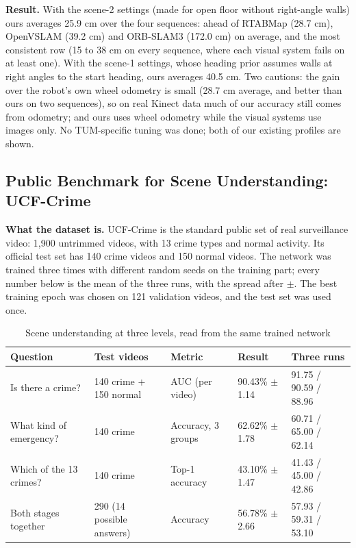 \documentclass[11pt, a4paper]{article}
\begin{document}
\noindent
\textbf{Result.} With the scene-2 settings (made for open floor without right-angle walls) ours averages 25.9 cm over the four sequences: ahead of RTABMap (28.7 cm), OpenVSLAM (39.2 cm) and ORB-SLAM3 (172.0 cm) on average, and the most consistent row (15 to 38 cm on every sequence, where each visual system fails on at least one). With the scene-1 settings, whose heading prior assumes walls at right angles to the start heading, ours averages 40.5 cm. Two cautions: the gain over the robot's own wheel odometry is small (28.7 cm average, and better than ours on two sequences), so on real Kinect data much of our accuracy still comes from odometry; and ours uses wheel odometry while the visual systems use images only. No TUM-specific tuning was done; both of our existing profiles are shown.

\subsection{Public Benchmark for Scene Understanding: UCF-Crime}
\noindent
\textbf{What the dataset is.} UCF-Crime \cite{sultani2018} is the standard public set of real surveillance video: 1,900 untrimmed videos, with 13 crime types and normal activity. Its official test set has 140 crime videos and 150 normal videos. The network was trained three times with different random seeds on the training part; every number below is the mean of the three runs, with the spread after $\pm$. The best training epoch was chosen on 121 validation videos, and the test set was used once.

\begin{table}[H]
    \centering
    \footnotesize
    \renewcommand{\arraystretch}{1.25}
    \begin{tabular}{|p{3.2cm}|p{3.2cm}|p{2.6cm}|p{2.6cm}|p{2.7cm}|}
        \hline
        \textbf{Question} & \textbf{Test videos} & \textbf{Metric} & \textbf{Result} & \textbf{Three runs} \\
        \hline
        Is there a crime? & 140 crime + 150 normal & AUC (per video) & 90.43\% $\pm$ 1.14 & 91.75 / 90.59 / 88.96 \\
        \hline
        What kind of emergency? & 140 crime & Accuracy, 3 groups & 62.62\% $\pm$ 1.78 & 60.71 / 65.00 / 62.14 \\
        \hline
        Which of the 13 crimes? & 140 crime & Top-1 accuracy & 43.10\% $\pm$ 1.47 & 41.43 / 45.00 / 42.86 \\
        \hline
        Both stages together & 290 (14 possible answers) & Accuracy & 56.78\% $\pm$ 2.66 & 57.93 / 59.31 / 53.10 \\
        \hline
    \end{tabular}
    \caption{Scene understanding at three levels, read from the same trained network}
    \label{tab:levels}
\end{table}
\end{document}

